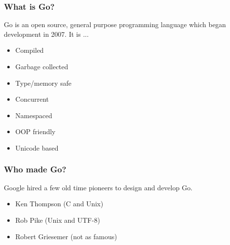 \documentclass{beamer}
\begin{document}
\begin{frame}
  \frametitle{What is Go?}

  Go is an open source, general purpose programming language which
  began development in 2007.  It is ...
  
  \begin{itemize}
    \item Compiled
    \item Garbage collected
    \item Type/memory safe
    \item Concurrent
    \item Namespaced
    \item OOP friendly
    \item Unicode based
  \end{itemize}
\end{frame}
\begin{frame}
  \frametitle{Who made Go?}

  Google hired a few old time pioneers to design and develop Go.
  
  \begin{itemize}
    \item Ken Thompson (C and Unix)
    \item Rob Pike (Unix and UTF-8)
    \item Robert Griesemer (not as famous)
  \end{itemize}
\end{frame}
\end{document}
